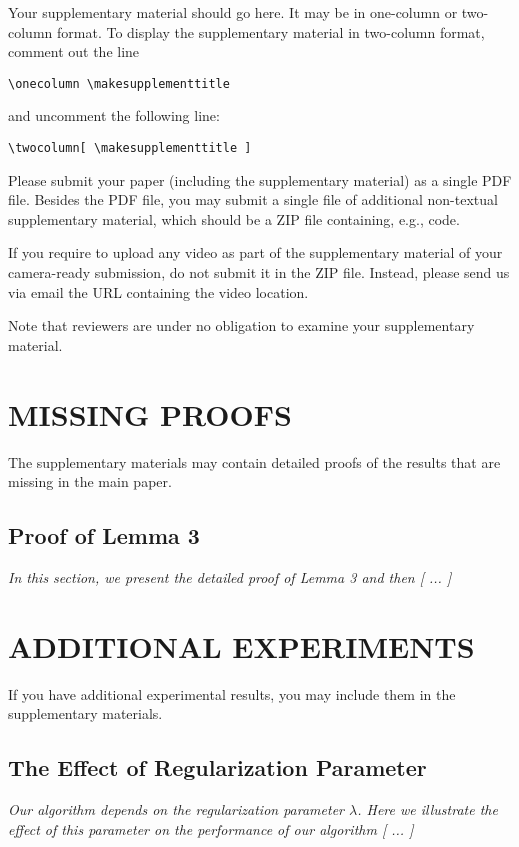 Your supplementary material should go here. It may be in one-column or two-column format. To display the supplementary material in two-column format, comment out the line
\begin{verbatim}
\onecolumn \makesupplementtitle
\end{verbatim}
and uncomment the following line:
\begin{verbatim}
\twocolumn[ \makesupplementtitle ]
\end{verbatim}

Please submit your paper (including the supplementary material) as a single PDF file. Besides the PDF file, you may submit a single file of additional non-textual supplementary material, which should be a ZIP file containing, e.g., code.

If you require to upload any video as part of the supplementary material of your camera-ready submission, do not submit it in the ZIP file. Instead, please send us via email the URL containing the video location.

Note that reviewers are under no obligation to examine your supplementary material.

\section{MISSING PROOFS}

The supplementary materials may contain detailed proofs of the results that are missing in the main paper.

\subsection{Proof of Lemma 3}

\textit{In this section, we present the detailed proof of Lemma 3 and then [ ... ]}

\section{ADDITIONAL EXPERIMENTS}

If you have additional experimental results, you may include them in the supplementary materials.

\subsection{The Effect of Regularization Parameter}

\textit{Our algorithm depends on the regularization parameter $\lambda$. Here we illustrate the effect of this parameter on the performance of our algorithm [ ... ]}

